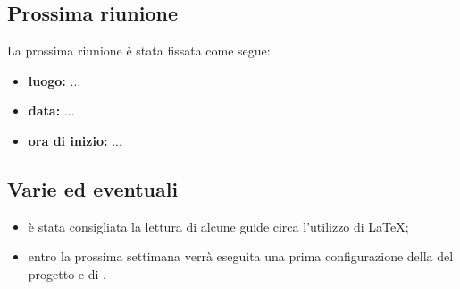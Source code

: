 \subsection{Prossima riunione}
La prossima riunione è stata fissata come segue:
\begin{itemize}
	\item \textbf{luogo:} ...
	\item \textbf{data:} ...
	\item \textbf{ora di inizio:} ...
\end{itemize}


\subsection{Varie ed eventuali}
\begin{itemize}

	\item è stata consigliata la lettura di alcune guide circa l'utilizzo di \LaTeX{};
	\item entro la prossima settimana verrà eseguita una prima configurazione della  del progetto e di .
\end{itemize}


